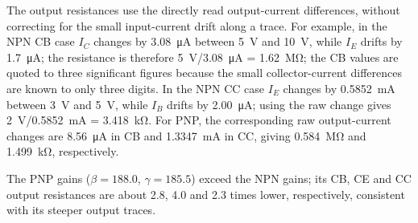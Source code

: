 \documentclass[12pt,a4paper]{article}
\begin{document}
	The output resistances use the directly read output-current differences,
	without correcting for the small input-current drift along a trace. For
	example, in the NPN CB case $I_C$ changes by
	\SI{3.08}{\micro\ampere} between \SI{5}{\volt} and \SI{10}{\volt},
	while $I_E$ drifts by \SI{1.7}{\micro\ampere}; the resistance is
	therefore \SI{5}{\volt}/\SI{3.08}{\micro\ampere} =
	\SI{1.62}{\mega\ohm}; the CB values are quoted to three significant
	figures because the small collector-current differences are known to only
	three digits. In the NPN CC case $I_E$ changes by
	\SI{0.5852}{\milli\ampere} between \SI{3}{\volt} and \SI{5}{\volt},
	while $I_B$ drifts by \SI{2.00}{\micro\ampere}; using the raw change
	gives \SI{2}{\volt}/\SI{0.5852}{\milli\ampere} =
	\SI{3.418}{\kilo\ohm}. For PNP, the corresponding raw output-current
	changes are \SI{8.56}{\micro\ampere} in CB and
	\SI{1.3347}{\milli\ampere} in CC, giving
	\SI{0.584}{\mega\ohm} and \SI{1.499}{\kilo\ohm}, respectively.

	The PNP gains ($\beta = 188.0$, $\gamma = 185.5$) exceed the NPN gains;
	its CB, CE and CC output resistances are about 2.8, 4.0 and 2.3 times
	lower, respectively, consistent with its steeper output traces.

\end{document}
